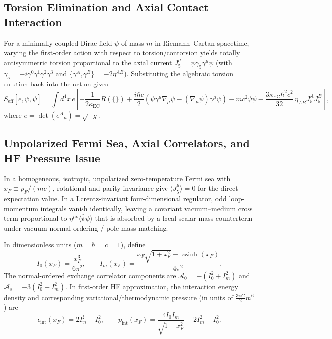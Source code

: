 \documentclass[11pt,a4paper]{article}
\begin{document}
\subsection{Torsion Elimination and Axial Contact Interaction}
For a minimally coupled Dirac field $\psi$ of mass $m$ in Riemann--Cartan spacetime, varying the first-order action with respect to torsion/contorsion yields totally antisymmetric torsion proportional to the axial current $J_5^\mu = \bar{\psi}\gamma_5\gamma^\mu\psi$ (with $\gamma_5 = -i\gamma^0\gamma^1\gamma^2\gamma^3$ and $\{\gamma^A, \gamma^B\} = -2\eta^{AB}$). Substituting the algebraic torsion solution back into the action gives
\begin{equation}
S_{\mathrm{eff}}[e,\psi,\bar{\psi}] = \int d^4x\,e\left[ -\frac{1}{2\kappa_{\mathrm{EC}}}R(\{\}) + \frac{i\hbar c}{2}\left(\bar{\psi}\gamma^\mu\nabla_\mu\psi - (\nabla_\mu\bar{\psi})\gamma^\mu\psi\right) - mc^2\bar{\psi}\psi - \frac{3\kappa_{\mathrm{EC}}\hbar^2 c^2}{32}\,\eta_{AB} J_5^A J_5^B \right],
\end{equation}
where $e = \det(e^A{}_\mu) = \sqrt{-g}$.

\subsection{Unpolarized Fermi Sea, Axial Correlators, and HF Pressure Issue}
In a homogeneous, isotropic, unpolarized zero-temperature Fermi sea with $x_F \equiv p_F/(mc)$, rotational and parity invariance give $\langle J_5^\mu \rangle = 0$ for the direct expectation value. In a Lorentz-invariant four-dimensional regulator, odd loop-momentum integrals vanish identically, leaving a covariant vacuum--medium cross term proportional to $\eta^{\mu\nu}\langle\bar{\psi}\psi\rangle$ that is absorbed by a local scalar mass counterterm under vacuum normal ordering / pole-mass matching.

In dimensionless units ($m = \hbar = c = 1$), define
\begin{equation}
I_0(x_F) = \frac{x_F^3}{6\pi^2}, \qquad I_m(x_F) = \frac{x_F\sqrt{1+x_F^2} - \operatorname{asinh}(x_F)}{4\pi^2}.
\end{equation}
The normal-ordered exchange correlator components are $\mathcal{A}_0 = -(I_0^2 + I_m^2)$ and $\mathcal{A}_s = -3(I_0^2 - I_m^2)$. In first-order HF approximation, the interaction energy density and corresponding variational/thermodynamic pressure (in units of $\frac{3\pi G}{2}m^6$) are
\begin{equation}
\epsilon_{\mathrm{int}}(x_F) = 2I_m^2 - I_0^2, \qquad p_{\mathrm{int}}(x_F) = \frac{4I_0 I_m}{\sqrt{1+x_F^2}} - 2I_m^2 - I_0^2.
\end{equation}
\end{document}
